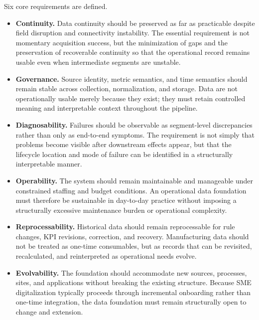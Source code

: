\documentclass[systems,article,submit,pdftex,moreauthors]{Definitions/mdpi}
\begin{document}
Six core requirements are defined.

\begin{itemize}
    \item[\textbf{R1.}] \textbf{Continuity.} Data continuity should be preserved as far as practicable despite field disruption and connectivity instability. The essential requirement is not momentary acquisition success, but the minimization of gaps and the preservation of recoverable continuity so that the operational record remains usable even when intermediate segments are unstable.

    \item[\textbf{R2.}] \textbf{Governance.} Source identity, metric semantics, and time semantics should remain stable across collection, normalization, and storage. Data are not operationally usable merely because they exist; they must retain controlled meaning and interpretable context throughout the pipeline.

    \item[\textbf{R3.}] \textbf{Diagnosability.} Failures should be observable as segment-level discrepancies rather than only as end-to-end symptoms. The requirement is not simply that problems become visible after downstream effects appear, but that the lifecycle location and mode of failure can be identified in a structurally interpretable manner.

    \item[\textbf{R4.}] \textbf{Operability.} The system should remain maintainable and manageable under constrained staffing and budget conditions. An operational data foundation must therefore be sustainable in day-to-day practice without imposing a structurally excessive maintenance burden or operational complexity.

    \item[\textbf{R5.}] \textbf{Reprocessability.} Historical data should remain reprocessable for rule changes, KPI revisions, correction, and recovery. Manufacturing data should not be treated as one-time consumables, but as records that can be revisited, recalculated, and reinterpreted as operational needs evolve.

    \item[\textbf{R6.}] \textbf{Evolvability.} The foundation should accommodate new sources, processes, sites, and applications without breaking the existing structure. Because SME digitalization typically proceeds through incremental onboarding rather than one-time integration, the data foundation must remain structurally open to change and extension.
\end{itemize}
\end{document}
